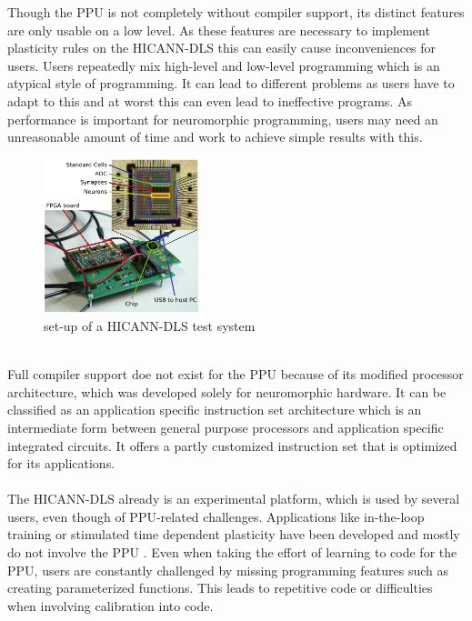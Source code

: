 Though the \ac{PPU} is not completely without compiler support, its distinct features are only usable on a low level.
As these features are necessary to implement plasticity rules on the \ac{HICANN-DLS} this can easily cause inconveniences for users.
Users repeatedly mix high-level and low-level programming which is an atypical style of programming.
It can lead to different problems as users have to adapt to this and at worst this can even lead to ineffective programs.
As performance is important for neuromorphic programming, users may need an unreasonable amount of time and work to achieve simple results with this.
\\
\begin{figure}
    \centering
    \includegraphics[width=0.4\textwidth]{pictures/Fig1.png}
    \caption{\label{fig:dlsboard} set-up of a \ac{HICANN-DLS} test system}
\end{figure}
\\
Full compiler support doe not exist for the \ac{PPU} because of its modified processor architecture, which was developed solely for neuromorphic hardware.
It can be classified as an application specific instruction set architecture which is an intermediate form between general purpose processors and application specific integrated circuits.
It offers a partly customized instruction set that is optimized for its applications.
\\
\\
The \ac{HICANN-DLS} already is an experimental platform, which is used by several users, even though of \ac{PPU}-related challenges.
Applications like in-the-loop training or stimulated time dependent plasticity have been developed and mostly do not involve the \ac{PPU} .
Even when taking the effort of learning to code for the \ac{PPU}, users are constantly challenged by missing programming features such as creating parameterized functions.
This leads to repetitive code or difficulties when involving calibration into code.

